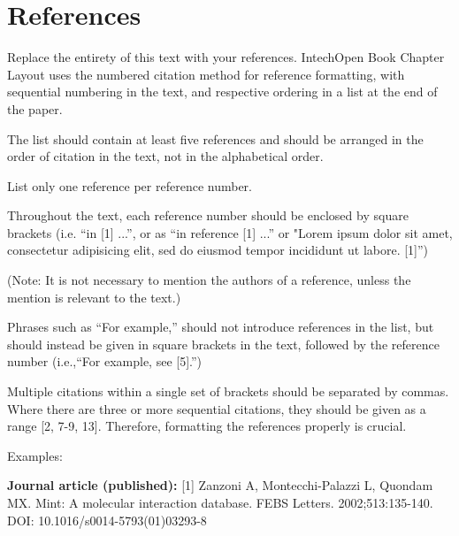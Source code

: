 \documentclass[numbers,sort&compress]{IntechOpen-Book}%
\begin{document}
\begin{backmatter}
\begin{authordetails}
	
	
\end{authordetails}

\section*{References}
Replace the entirety of this text with your references. IntechOpen Book Chapter Layout uses the numbered citation method for reference formatting, with sequential numbering in the text, and respective ordering in a list at the end of the paper.

The list should contain at least five references and should be arranged in the order of citation in the text, not in the alphabetical order.

List only one reference per reference number.

Throughout the text, each reference number should be enclosed by square brackets (i.e. “in [1] ...”, or as “in reference [1] ...” or "Lorem ipsum dolor sit amet, consectetur adipisicing elit, sed do eiusmod tempor incididunt ut labore. [1]”)

(Note: It is not necessary to mention the authors of a reference, unless the mention is relevant to the text.)

Phrases such as “For example,” should not introduce references in the list, but should instead be given in square brackets in the text, followed by the reference number (i.e.,“For example, see [5].”)

Multiple citations within a single set of brackets should be separated by commas. Where there are three or more sequential citations, they should be given as a range [2, 7-9, 13]. Therefore, formatting the references properly is crucial.

Examples:

\textbf{Journal article (published):} [1] Zanzoni A, Montecchi-Palazzi L, Quondam MX. Mint: A molecular interaction database. FEBS Letters. 2002;513:135-140. DOI: 10.1016/s0014-5793(01)03293-8


\end{backmatter}
\end{document}
